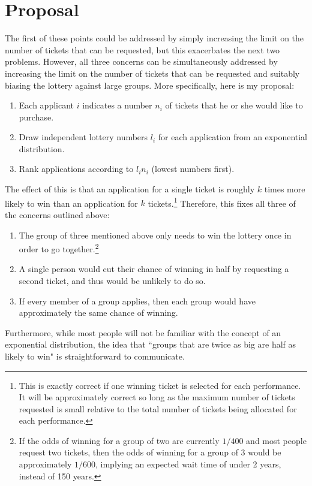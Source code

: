 \documentclass[11pt, oneside]{article}   	%
\begin{document}
\section{Proposal}
The first of these points could be addressed by simply increasing the limit on the number of tickets that can be requested, but this exacerbates the next two problems. However, all three concerns can be simultaneously addressed by increasing the limit on the number of tickets that can be requested and suitably biasing the lottery against large groups. More specifically, here is my proposal:
\begin{enumerate}[label=\Roman*.]
\item Each applicant $i$ indicates a number $n_i$ of tickets that he or she would like to purchase.
\item Draw independent lottery numbers $l_i$ for each application from an exponential distribution.
\item Rank applications according to $l_i n_i$ (lowest numbers first).
\end{enumerate}
The effect of this is that an application for a single ticket is roughly $k$ times more likely to win than an application for $k$ tickets.\footnote{This is exactly correct if one winning ticket is selected for each performance. It will be approximately correct so long as the maximum number of tickets requested is small relative to the total number of tickets being allocated for each performance.} Therefore, this fixes all three of the concerns outlined above:
\begin{enumerate}
\item The group of three mentioned above only needs to win the lottery once in order to go together.\footnote{If the odds of winning for a group of two are currently $1/400$ and most people request two tickets, then the odds of winning for a group of 3 would be approximately $1/600$, implying an expected wait time of under 2 years, instead of 150 years.}
\item A single person would cut their chance of winning in half by requesting a second ticket, and thus would be unlikely to do so.
\item If every member of a group applies, then each group would have approximately the same chance of winning.
\end{enumerate}
Furthermore, while most people will not be familiar with the concept of an exponential distribution, the idea that ``groups that are twice as big are half as likely to win" is straightforward to communicate. 
\end{document}
